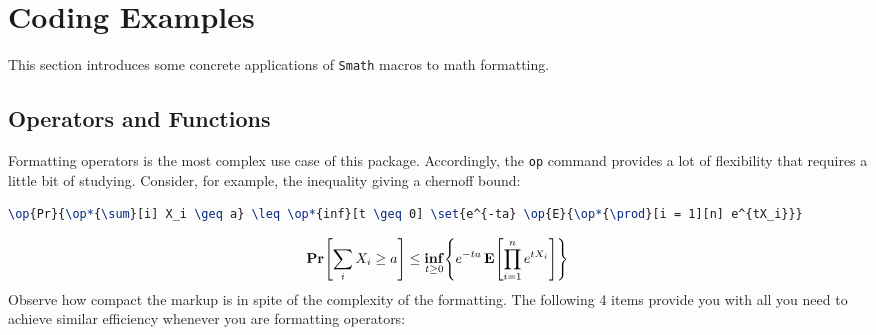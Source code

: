 \documentclass[a4paper,10pt]{scrartcl}
\begin{document}
\section{Coding Examples}
This section introduces some concrete applications of \texttt{Smath} macros to math formatting.

\subsection{Operators and Functions}
Formatting operators is the most complex use case of this package. Accordingly, the \texttt{op} command provides a lot of flexibility that requires a little bit of studying. Consider, for example, the inequality giving a chernoff bound:
\begin{lstlisting}[caption=Chernoff bound, language=TeX]
\op{Pr}{\op*{\sum}[i] X_i \geq a} \leq \op*{inf}[t \geq 0] \set{e^{-ta} \op{E}{\op*{\prod}[i = 1][n] e^{tX_i}}}
\end{lstlisting}
\begin{align} 
  \op{Pr}{\op*{\sum}[i] X_i \geq a} \leq \op*{inf}[t \geq 0] \set{e^{-ta} \op{E}{\op*{\prod}[i = 1][n] e^{tX_i}}}
\end{align}
Observe how compact the markup is in spite of the complexity of the formatting. The following 4 items provide you with all you need to achieve similar efficiency whenever you are formatting operators:
\end{document}
